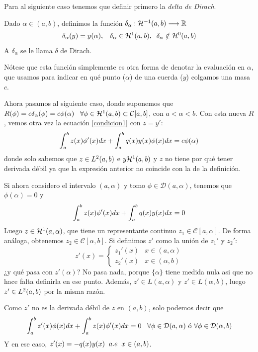Para al siguiente caso tenemos que definir primero la \textit{delta de Dirach}.

\medskip

\begin{definition}
Dado $\alpha\in(a,b)$, definimos la función $\funcion{\delta_\alpha}{\sobolev{-1}}{\R}$
\[
\delta_\alpha(y)=y(\alpha), \espacio \delta_\alpha\in\sobolev{1}, \;\; \delta_\alpha\notin\sobolev{0}
\]
A $\delta_\alpha$ se le llama $\delta$ de Dirach.
\end{definition}
\begin{remark}
Nótese que esta función simplemente es otra forma de denotar la evaluación en $\alpha$, que usamos para indicar en qué punto ($\alpha$) de una cuerda ($y$) colgamos una masa $c$. 
\end{remark}

Ahora pasamos al siguiente caso, donde suponemos que $R(\phi)=c\delta_\alpha(\phi)=c\phi(\alpha) \espacio \forall \phi\in\sobolev{1}\subset\continuas$, con $a<\alpha<b$. Con esta nueva $R$, vemos otra vez la ecuación \ref{condicion1} con $z=y'$:
\[
\integral{a}{b}{z(x)\phi'(x)dx}+\integral{a}{b}{q(x)y(x)\phi(x)dx}=c\phi(\alpha)
\]
donde solo sabemos que $z\in\lebesgue{2}$ e $y\sobolev{1}$ y $z$ no tiene por qué tener derivada débil ya que la expresión anterior no coincide con la de la definición. 

Si ahora considero el intervalo $(a,\alpha)$ y tomo $\phi\in\mathcal{D}(a,\alpha)$, tenemos que $\phi(\alpha)=0$ y
\[
\integral{a}{b}{z(x)\phi'(x)dx}+\integral{a}{b}{q(x)y(x)dx}=0
\]
Luego $z\in\sobolev[a,\alpha]{1}$, que tiene un representante continuo $z_1\in\mathcal{C}[a,\alpha]$. De forma análoga, obtenemos $z_2\in\mathcal{C}[\alpha,b]$. Si definimos $z'$ como la unión de $z_1'$ y $z_2'$:
\[
z'(x)= \left\{
\begin{array}{cc}
z_1'(x) & x\in(a,\alpha) \\
z_2'(x) & x\in(\alpha,b)
\end{array}
\right.
\]
¿y qué pasa con $z'(\alpha)$? No pasa nada, porque $\{\alpha\}$ tiene medida nula asi que no hace falta definirla en ese punto. Además, $z'\in L(a,\alpha)$ y $z'\in L(\alpha,b)$, luego $z'\in\lebesgue{2}$ por la misma razón. 

Como $z'$ no es la derivada débil de $z$ en $(a,b)$, solo podemos decir que
\[
\integral{a}{b}{z'(x)\phi(x)dx}+\integral{a}{b}{z(x)\phi'(x)dx}=0 \espacio \forall \phi\in\mathcal{D}(a,\alpha) \text{ ó } \forall \phi\in\mathcal{D}(\alpha,b)
\]
Y en ese caso, $z'(x)=-q(x)y(x) \;\; \casipordoquier$. 

